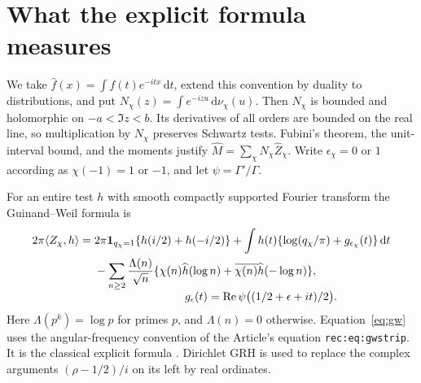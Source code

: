 \documentclass[11pt]{article}
\newcommand{\dd}{\,\mathrm d}
\newcommand{\Real}{\operatorname{Re}}
\begin{document}
\section{What the explicit formula measures}\label{sec:explicit}
We take \(\widehat f(x)=\int f(t)e^{-itx}\dd t\), extend this convention by duality to distributions, and put \(N_\chi(z)=\int e^{-izu}\dd\nu_\chi(u)\).
Then \(N_\chi\) is bounded and holomorphic on \(-a<\Im z<b\). Its derivatives of all orders are bounded on the real line, so multiplication by \(N_\chi\) preserves Schwartz tests. Fubini's theorem, the unit-interval bound, and the moments justify
\(\widehat M=\sum_\chi N_\chi\widehat Z_\chi\).
Write \(\epsilon_\chi=0\) or \(1\) according as \(\chi(-1)=1\) or \(-1\), and let \(\psi=\Gamma'/\Gamma\).

For an entire test \(h\) with smooth compactly supported Fourier transform the Guinand--Weil formula is
\begin{align}
2\pi\langle Z_\chi,h\rangle
={}&2\pi{\bf1}_{q_\chi=1}\{h(i/2)+h(-i/2)\}
+\int h(t)\{\log(q_\chi/\pi)+g_{\epsilon_\chi}(t)\}\dd t \notag\\
&-\sum_{n\ge2}\frac{\Lambda(n)}{\sqrt n}
  \{\chi(n)\widehat h(\log n)+\overline{\chi(n)}\widehat h(-\log n)\},
\label{eq:gw}\\[-4pt]
&\hspace{28mm}g_\epsilon(t)=\Real\psi\big((1/2+\epsilon+it)/2\big).\notag
\end{align}
Here \(\Lambda(p^k)=\log p\) for primes \(p\), and \(\Lambda(n)=0\) otherwise.
Equation~\eqref{eq:gw} uses the angular-frequency convention of the Article's equation \texttt{rec:eq:gwstrip}. It is the classical explicit formula \cite{gw,brs}. Dirichlet GRH is used to replace the complex arguments \((\rho-1/2)/i\) on its left by real ordinates.
\end{document}
